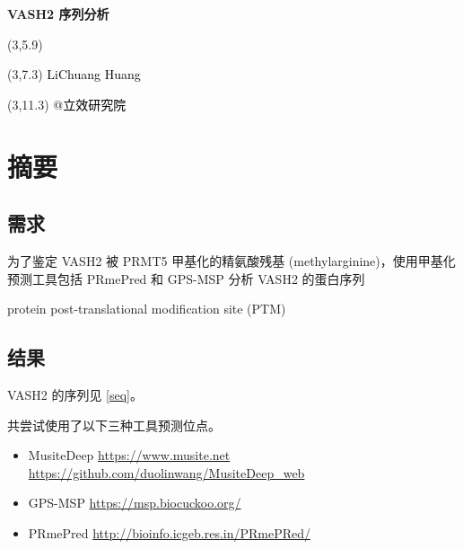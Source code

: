 \documentclass[
]{article}
\author{}
\date{\vspace{-2.5em}}
\providecommand{\tightlist}{%
  \setlength{\itemsep}{0pt}\setlength{\parskip}{0pt}}
\begin{document}
\begin{titlepage} 
\begin{center} \textbf{\Huge VASH2 序列分析}
\vspace{4em} \begin{textblock}{10}(3,5.9) \huge
\textbf{\textcolor{white}{2024-03-27}}
\end{textblock} \begin{textblock}{10}(3,7.3)
\Large \textcolor{black}{LiChuang Huang}
\end{textblock} \begin{textblock}{10}(3,11.3)
\Large \textcolor{black}{@立效研究院}
\end{textblock} \end{center} \end{titlepage}
\restoregeometry


\tableofcontents

\listoffigures

\listoftables

\newpage


\hypertarget{abstract}{%
\section{摘要}\label{abstract}}

\hypertarget{ux9700ux6c42}{%
\subsection{需求}\label{ux9700ux6c42}}

为了鉴定 VASH2 被 PRMT5 甲基化的精氨酸残基 (methylarginine)，使用甲基化预测工具包括 PRmePred 和 GPS-MSP 分析 VASH2 的蛋白序列

protein post-translational modification site (PTM)

\hypertarget{ux7ed3ux679c}{%
\subsection{结果}\label{ux7ed3ux679c}}

VASH2 的序列见 \ref{seq}。

共尝试使用了以下三种工具预测位点。

\begin{itemize}
\tightlist
\item
  MusiteDeep \url{https://www.musite.net} \url{https://github.com/duolinwang/MusiteDeep_web}
\item
  GPS-MSP \url{https://msp.biocuckoo.org/}
\item
  PRmePred \url{http://bioinfo.icgeb.res.in/PRmePRed/}
\end{itemize}
\end{document}
